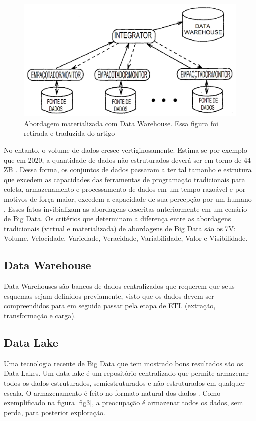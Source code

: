 \begin{figure}[!ht]
\centering
\includegraphics[width=0.3\linewidth]{figuras/DW.png}
\caption{Abordagem materializada com Data Warehouse. Essa figura foi retirada e traduzida do artigo \cite{Widom:1995:RPD:221270.221319}}
\label{fig2}
\end{figure}

No entanto, o volume de dados cresce vertiginosamente. Estima-se por exemplo que em 2020, a quantidade de dados não estruturados deverá ser em torno de 44 ZB \cite{turner2014digital}.
Dessa forma, os conjuntos de dados passaram a ter tal tamanho e estrutura que excedem as capacidades das ferramentas de programação tradicionais para coleta, armazenamento e processamento de dados em um tempo razoável e por motivos de força maior, excedem a capacidade de sua percepção por um humano \cite{miloslavskaya2014information}. Esses fatos invibializam as abordagens descritas anteriormente em um cenário de Big Data. Os critérios que determinam a diferença entre as abordagens tradicionais (virtual e materializada) de abordagens de Big Data são os 7V: Volume, Velocidade, Variedade, Veracidade, Variabilidade, Valor e Visibilidade.

\subsection{Data Warehouse}
Data Warehouses são bancos de dados centralizados que requerem que seus esquemas sejam definidos previamente, visto que os dados devem ser compreendidos para em seguida passar pela etapa de ETL (extração, transformação e carga).

\subsection{Data Lake}
Uma tecnologia recente de Big Data que tem mostrado bons resultados são os Data Lakes.
Um data lake é um repositório centralizado que permite armazenar todos os  dados estruturados, semiestruturados e não estruturados em qualquer escala. O armazenamento é feito no formato natural dos dados \cite{laskowski2016data}. Como exemplificado na figura \ref{fig3}, a preocupação é armazenar todos os dados, sem perda, para posterior exploração.

